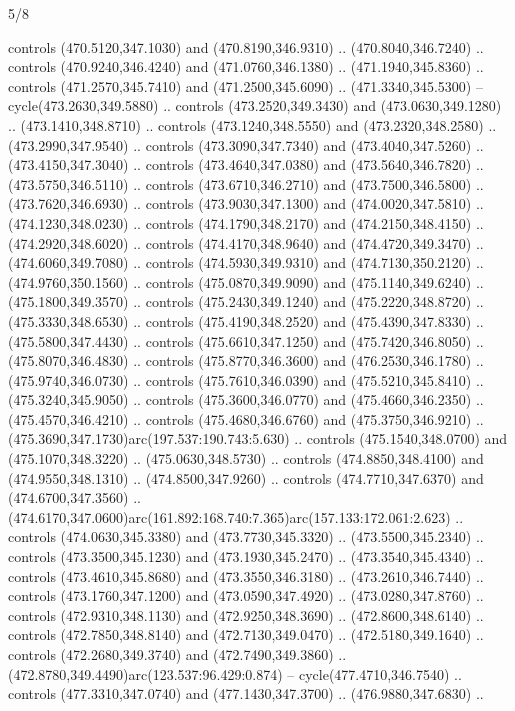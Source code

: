 \begin{flagdescription}{5/8}
\begin{scope}[xshift=0.5\flaglength,yshift=0.5\flagwidth,scale=\flagwidth/475.63]
\begin{scope}[y=0.8pt, x=0.8pt, yscale=-1, xscale=1,shift={(-450,-300)}]
\begin{scope}[cm={{1.0,0.0,0.0,1.0,(-0.0002,0.12556)}},cm={{1.0,0.0,0.0,1.0,(0.00179,0.0)}}]
\begin{scope}[cm={{1.01375,0.0,0.0,1.01375,(-5.36379,-4.94943)}}]
  controls (470.5120,347.1030) and (470.8190,346.9310) .. (470.8040,346.7240) ..
  controls (470.9240,346.4240) and (471.0760,346.1380) .. (471.1940,345.8360) ..
  controls (471.2570,345.7410) and (471.2500,345.6090) .. (471.3340,345.5300) --
  cycle(473.2630,349.5880) .. controls (473.2520,349.3430) and
  (473.0630,349.1280) .. (473.1410,348.8710) .. controls (473.1240,348.5550) and
  (473.2320,348.2580) .. (473.2990,347.9540) .. controls (473.3090,347.7340) and
  (473.4040,347.5260) .. (473.4150,347.3040) .. controls (473.4640,347.0380) and
  (473.5640,346.7820) .. (473.5750,346.5110) .. controls (473.6710,346.2710) and
  (473.7500,346.5800) .. (473.7620,346.6930) .. controls (473.9030,347.1300) and
  (474.0020,347.5810) .. (474.1230,348.0230) .. controls (474.1790,348.2170) and
  (474.2150,348.4150) .. (474.2920,348.6020) .. controls (474.4170,348.9640) and
  (474.4720,349.3470) .. (474.6060,349.7080) .. controls (474.5930,349.9310) and
  (474.7130,350.2120) .. (474.9760,350.1560) .. controls (475.0870,349.9090) and
  (475.1140,349.6240) .. (475.1800,349.3570) .. controls (475.2430,349.1240) and
  (475.2220,348.8720) .. (475.3330,348.6530) .. controls (475.4190,348.2520) and
  (475.4390,347.8330) .. (475.5800,347.4430) .. controls (475.6610,347.1250) and
  (475.7420,346.8050) .. (475.8070,346.4830) .. controls (475.8770,346.3600) and
  (476.2530,346.1780) .. (475.9740,346.0730) .. controls (475.7610,346.0390) and
  (475.5210,345.8410) .. (475.3240,345.9050) .. controls (475.3600,346.0770) and
  (475.4660,346.2350) .. (475.4570,346.4210) .. controls (475.4680,346.6760) and
  (475.3750,346.9210) .. (475.3690,347.1730)arc(197.537:190.743:5.630) ..
  controls (475.1540,348.0700) and (475.1070,348.3220) .. (475.0630,348.5730) ..
  controls (474.8850,348.4100) and (474.9550,348.1310) .. (474.8500,347.9260) ..
  controls (474.7710,347.6370) and (474.6700,347.3560) ..
  (474.6170,347.0600)arc(161.892:168.740:7.365)arc(157.133:172.061:2.623) ..
  controls (474.0630,345.3380) and (473.7730,345.3320) .. (473.5500,345.2340) ..
  controls (473.3500,345.1230) and (473.1930,345.2470) .. (473.3540,345.4340) ..
  controls (473.4610,345.8680) and (473.3550,346.3180) .. (473.2610,346.7440) ..
  controls (473.1760,347.1200) and (473.0590,347.4920) .. (473.0280,347.8760) ..
  controls (472.9310,348.1130) and (472.9250,348.3690) .. (472.8600,348.6140) ..
  controls (472.7850,348.8140) and (472.7130,349.0470) .. (472.5180,349.1640) ..
  controls (472.2680,349.3740) and (472.7490,349.3860) ..
  (472.8780,349.4490)arc(123.537:96.429:0.874) -- cycle(477.4710,346.7540) ..
  controls (477.3310,347.0740) and (477.1430,347.3700) .. (476.9880,347.6830) ..

\end{scope}
\end{scope}
\end{scope}
\end{scope}
\end{flagdescription}
